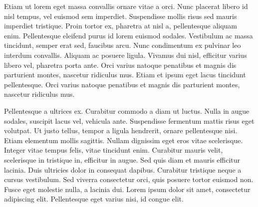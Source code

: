 Etiam ut lorem eget massa convallis ornare vitae a orci. Nunc placerat libero id nisl tempus, vel euismod sem imperdiet. Suspendisse mollis risus sed mauris imperdiet tristique. Proin tortor ex, pharetra at nisl a, pellentesque aliquam enim. Pellentesque eleifend purus id lorem euismod sodales. Vestibulum ac massa tincidunt, semper erat sed, faucibus arcu. Nunc condimentum ex pulvinar leo interdum convallis. Aliquam ac posuere ligula. Vivamus dui nisl, efficitur varius libero vel, pharetra porta ante. Orci varius natoque penatibus et magnis dis parturient montes, nascetur ridiculus mus. Etiam et ipsum eget lacus tincidunt pellentesque. Orci varius natoque penatibus et magnis dis parturient montes, nascetur ridiculus mus.

Pellentesque a ultrices ex. Curabitur commodo a diam ut luctus. Nulla in augue sodales, suscipit lacus vel, vehicula ante. Suspendisse fermentum mattis risus eget volutpat. Ut justo tellus, tempor a ligula hendrerit, ornare pellentesque nisi. Etiam elementum mollis sagittis. Nullam dignissim eget eros vitae scelerisque. Integer vitae tempus felis, vitae tincidunt enim. Curabitur mauris velit, scelerisque in tristique in, efficitur in augue. Sed quis diam et mauris efficitur lacinia. Duis ultricies dolor in consequat dapibus. Curabitur tristique neque a cursus vestibulum. Sed viverra consectetur orci, quis posuere tortor euismod non. Fusce eget molestie nulla, a lacinia dui. Lorem ipsum dolor sit amet, consectetur adipiscing elit. Pellentesque eget varius nisi, id congue elit.